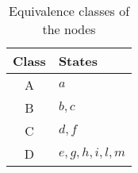 \begin{example}
    \begin{table}[H]
        \centering
        \begin{tabular}{|c|l|}
            \hline
            \textbf{Class} & \textbf{States} \\
            \hline
            A & $a$ \\
            B & $b, c$ \\
            C & $d, f$ \\
            D & $e, g, h, i, l, m$ \\
            \hline
        \end{tabular}
        \caption{Equivalence classes of the nodes}
        \label{tab:equivalence_classes}
    \end{table}
\end{example}
 